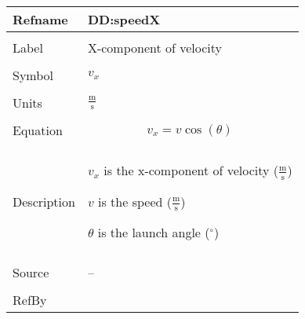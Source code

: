 \documentclass[12pt]{article}
\begin{document}
\noindent \begin{minipage}{\textwidth}
\begin{tabular}{p{} p{}}
\toprule \textbf{Refname} & \textbf{DD:speedX}
\label{DD:speedX}
\\ \midrule \\
Label & X-component of velocity
\\ \midrule \\
Symbol & ${v_{x}}$
\\ \midrule \\
Units & $\frac{\text{m}}{\text{s}}$
\\ \midrule \\
Equation & \begin{displaymath}
           {v_{x}}=v \cos\left(θ\right)
           \end{displaymath}
\\ \midrule \\
Description & \begin{symbDescription}
              \item{${v_{x}}$ is the x-component of velocity ($\frac{\text{m}}{\text{s}}$)}
              \item{$v$ is the speed ($\frac{\text{m}}{\text{s}}$)}
              \item{$θ$ is the launch angle (${}^{\circ}$)}
              \end{symbDescription}
\\ \midrule \\
Source & --
\\ \midrule \\
RefBy & 
\\ \bottomrule \end{tabular}
\end{minipage}
\par~
\end{document}
